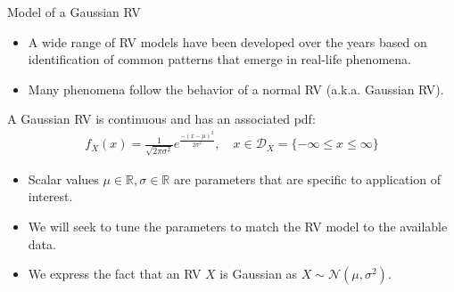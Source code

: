 \documentclass[handout,9pt]{beamer}
\begin{document}
%
\begin{frame}{Model of a Gaussian RV}

\begin{itemize}
\setlength{\itemsep}{10pt}
\item A wide range of RV models have been developed over the years based on identification of common patterns that emerge in real-life phenomena. 

\item Many phenomena follow the behavior of a normal RV (a.k.a. Gaussian RV). 

\end{itemize}

\begin{block}{}
A Gaussian RV is continuous and has an associated pdf:
\begin{align*}
f_X(x)=\frac{1}{\sqrt{2\pi\sigma^2}}e^{\frac{-(x-\mu)^2}{2\sigma^2}}, \quad  x\in \mathcal{D}_X=\{-\infty\leq x\leq \infty\}
\end{align*}
\end{block}
\begin{itemize}
\setlength{\itemsep}{10pt}
\item Scalar values $\mu\in \mathbb{R},\sigma\in \mathbb{R}$ are parameters that are specific to application of interest.

\item We will seek to tune the parameters to match the RV model to the available data. 

\item We express the fact that an RV $X$ is Gaussian as $X\sim \mathcal{N}(\mu,\sigma^2)$. 

\end{itemize}

\end{frame}
\end{document}
